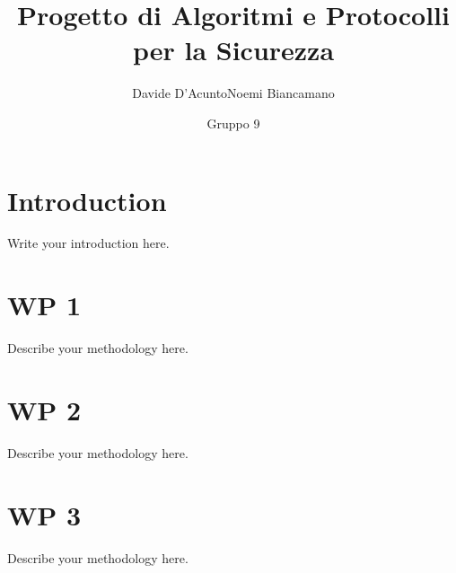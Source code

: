 \documentclass[a4paper,12pt]{article}
\title{Progetto di Algoritmi e Protocolli per la Sicurezza}
\author{Davide D'Acunto\quad Noemi Biancamano}
\date{Gruppo 9}
\begin{document}
\maketitle

\tableofcontents

\section{Introduction}
Write your introduction here.

\section{WP 1}
Describe your methodology here.

\section{WP 2}
Describe your methodology here.

\section{WP 3}
Describe your methodology here.
\end{document}

